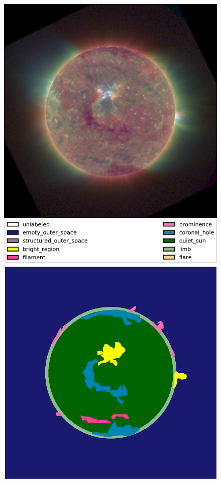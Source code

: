 \documentclass[twoside]{report}
\begin{document}
\begin{figure}[ht]
\begin{center}
    \includegraphics[scale=0.35]{g20170415000148}
    \includegraphics[scale=0.1]{g20170415000148-b}

\end{center}
\end{figure}
\end{document}
